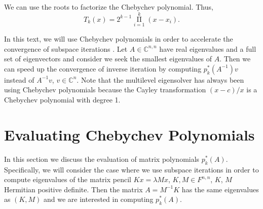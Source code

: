 \documentclass[%
	paper=a4,
	fontsize=10pt,
	DIV11,BCOR10mm,
	numbers=noenddot,
	abstract=yes
]{scrartcl}
\newcommand{\F}{\mathbb{C}}
\theoremstyle{definition}
\begin{document}
We can use the roots to factorize the Chebychev polynomial. Thus,
\[ T_k(x) = 2^{k-1} \mathop{\Pi}\limits_{i=1}^k (x - x_i). \]

In this text, we will use Chebychev polynomials in order to accelerate the
convergence of subspace iterations \cite[§5, §7.5]{Saad2011}. Let $A \in
\F^{n,n}$ have real eigenvalues and a full set of eigenvectors and consider we
seek the smallest eigenvalues of $A$. Then we can speed up the convergence of
inverse iteration by computing $p_k^*(A^{-1}) v$ instead of $A^{-1} v$, $v \in
\F^n$. Note that the multilevel eigensolver has always been using Chebychev
polynomials because the Cayley transformation $(x - c) / x$ is a Chebychev
polynomial with degree 1.



\section{Evaluating Chebychev Polynomials}

In this section we discuss the evaluation of matrix polynomials $p_k^*(A)$.
Specifically, we will consider the case where we use subspace iterations in
order to compute eigenvalues of the matrix pencil $K x = \lambda M x$, $K, M \in
F^{n,n}$, $K$, $M$ Hermitian positive definite. Then the matrix $A = M^{-1} K$
has the same eigenvalues as $(K, M)$ and we are interested in computing
$p_k^*(A)$.
\end{document}
